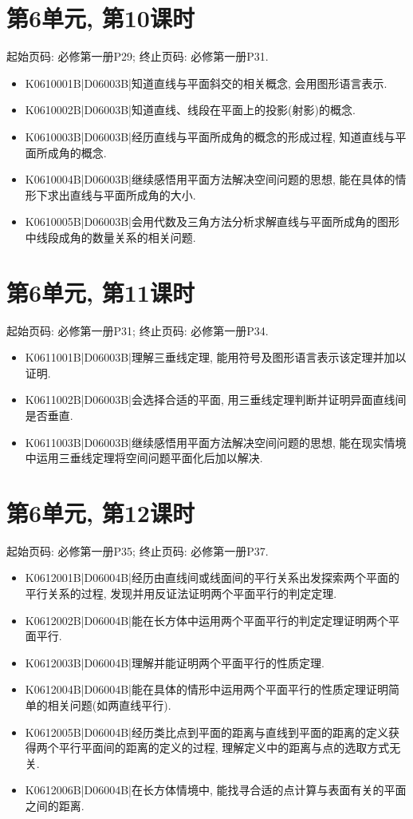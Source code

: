 \section*{第6单元, 第10课时}
起始页码: 必修第一册P29; 终止页码: 必修第一册P31.
\begin{itemize}
\item K0610001B|D06003B|知道直线与平面斜交的相关概念, 会用图形语言表示.
\item K0610002B|D06003B|知道直线、线段在平面上的投影(射影)的概念.
\item K0610003B|D06003B|经历直线与平面所成角的概念的形成过程, 知道直线与平面所成角的概念.
\item K0610004B|D06003B|继续感悟用平面方法解决空间问题的思想, 能在具体的情形下求出直线与平面所成角的大小.
\item K0610005B|D06003B|会用代数及三角方法分析求解直线与平面所成角的图形中线段成角的数量关系的相关问题.
\end{itemize}

\section*{第6单元, 第11课时}
起始页码: 必修第一册P31; 终止页码: 必修第一册P34.
\begin{itemize}
\item K0611001B|D06003B|理解三垂线定理, 能用符号及图形语言表示该定理并加以证明.
\item K0611002B|D06003B|会选择合适的平面, 用三垂线定理判断并证明异面直线间是否垂直.
\item K0611003B|D06003B|继续感悟用平面方法解决空间问题的思想, 能在现实情境中运用三垂线定理将空间问题平面化后加以解决.
\end{itemize}

\section*{第6单元, 第12课时}
起始页码: 必修第一册P35; 终止页码: 必修第一册P37.
\begin{itemize}
\item K0612001B|D06004B|经历由直线间或线面间的平行关系出发探索两个平面的平行关系的过程, 发现并用反证法证明两个平面平行的判定定理.
\item K0612002B|D06004B|能在长方体中运用两个平面平行的判定定理证明两个平面平行.
\item K0612003B|D06004B|理解并能证明两个平面平行的性质定理.
\item K0612004B|D06004B|能在具体的情形中运用两个平面平行的性质定理证明简单的相关问题(如两直线平行).
\item K0612005B|D06004B|经历类比点到平面的距离与直线到平面的距离的定义获得两个平行平面间的距离的定义的过程, 理解定义中的距离与点的选取方式无关.
\item K0612006B|D06004B|在长方体情境中, 能找寻合适的点计算与表面有关的平面之间的距离.
\end{itemize}

